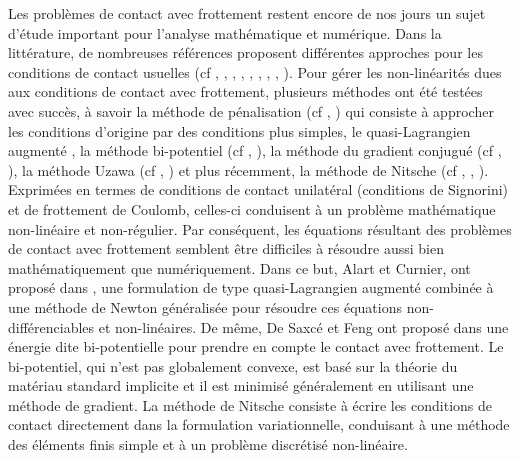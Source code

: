 Les problèmes de contact avec frottement restent encore de nos jours un sujet d'étude important pour l'analyse mathématique et numérique. Dans la littérature, de nombreuses références proposent différentes approches pour les conditions de contact usuelles (cf \cite{alart1991mixed}, \cite{chabrand1998various}, \cite{chouly2017overview}, \cite{khenous2006hybrid}, \cite{lebon2003contact}, \cite{laursen2013computational}, \cite{raous1988numerical}, \cite{sofonea2012mathematical}, \cite{wriggers2004computational}). Pour gérer les non-linéarités dues aux conditions de contact avec frottement, plusieurs méthodes ont été testées avec succès, à savoir la méthode de pénalisation (cf \cite{kikuchi1988contact}, \cite{oden1982interior}) qui consiste à approcher les conditions d'origine par des conditions plus simples, le quasi-Lagrangien augmenté \cite{alart1991mixed}, la méthode bi-potentiel (cf \cite{de1991new}, \cite{dumont2013enhanced}), la méthode du gradient conjugué (cf \cite{laursen2013computational}, \cite{wriggers2004computational}), la méthode Uzawa (cf \cite{raous1988numerical}, \cite{joli2008uzawa}) et plus récemment, la méthode de Nitsche (cf \cite{chouly2014adaptation}, \cite{chouly2015nitsche}, \cite{chouly2017overview}). Exprimées en termes de  conditions de contact unilatéral (conditions de Signorini) et de frottement de Coulomb, celles-ci conduisent à un problème mathématique non-linéaire et non-régulier. Par conséquent, les équations résultant des problèmes de contact avec frottement semblent être difficiles à résoudre aussi bien mathématiquement que numériquement. Dans ce but, Alart et Curnier, ont proposé dans \cite{alart1991mixed}, une formulation de type quasi-Lagrangien augmenté combinée à une méthode de Newton généralisée pour résoudre ces équations non-différenciables et non-linéaires.
De même, De Saxcé et Feng ont proposé dans \cite{de1991new} une énergie dite bi-potentielle pour prendre en compte le contact avec frottement. Le bi-potentiel, qui n'est pas globalement convexe, est basé sur la théorie du matériau standard implicite et il est minimisé généralement en utilisant une méthode de gradient. La méthode de Nitsche consiste à écrire les conditions de contact directement dans la formulation variationnelle, conduisant à une méthode des éléments finis simple et à un problème discrétisé non-linéaire.\\

